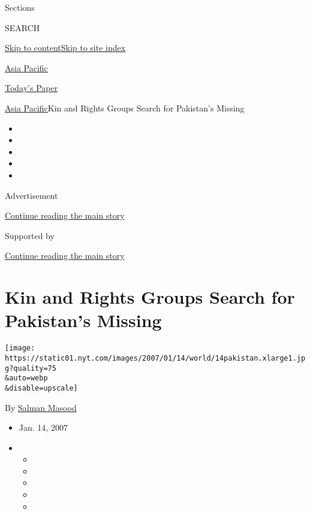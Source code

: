 Sections

SEARCH

\protect\hyperlink{site-content}{Skip to
content}\protect\hyperlink{site-index}{Skip to site index}

\href{https://www.nytimes.com/section/world/asia}{Asia Pacific}

\href{https://myaccount.nytimes.com/auth/login?response_type=cookie\&client_id=vi}{}

\href{https://www.nytimes.com/section/todayspaper}{Today's Paper}

\href{/section/world/asia}{Asia Pacific}\textbar{}Kin and Rights Groups
Search for Pakistan's Missing

\begin{itemize}
\item
\item
\item
\item
\item
\end{itemize}

Advertisement

\protect\hyperlink{after-top}{Continue reading the main story}

Supported by

\protect\hyperlink{after-sponsor}{Continue reading the main story}

\hypertarget{kin-and-rights-groups-search-for-pakistans-missing}{%
\section{Kin and Rights Groups Search for Pakistan's
Missing}\label{kin-and-rights-groups-search-for-pakistans-missing}}

\texttt{[image: https://static01.nyt.com/images/2007/01/14/world/14pakistan.xlarge1.jpg?quality=75\\\&auto=webp\\\&disable=upscale]}

By \href{https://www.nytimes.com/by/salman-masood}{Salman Masood}

\begin{itemize}
\item
  Jan. 14, 2007
\item
  \begin{itemize}
  \item
  \item
  \item
  \item
  \item
  \end{itemize}
\end{itemize}

